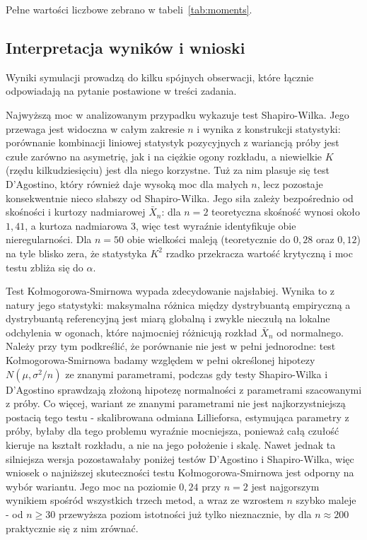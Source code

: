 \documentclass[12pt,a4paper]{article}
\begin{document}
Pełne wartości liczbowe zebrano w tabeli~\ref{tab:moments}.

\begin{table}[H]
    \centering
    \caption{Skośność i kurtoza nadmiarowa średniej $\bar{X}_n$ z rozkładu $\mathrm{Exp}(1)$: empiryczne wartości z $100\,000$ realizacji dla każdego $n$ i krzywe teoretyczne.}
    \label{tab:moments}
    
\end{table}

\subsection{Interpretacja wyników i wnioski}

Wyniki symulacji prowadzą do kilku spójnych obserwacji, które łącznie odpowiadają na pytanie postawione w treści zadania.

Najwyższą moc w analizowanym przypadku wykazuje test Shapiro-Wilka. Jego przewaga jest widoczna w całym zakresie $n$ i wynika z konstrukcji statystyki: porównanie kombinacji liniowej statystyk pozycyjnych z wariancją próby jest czułe zarówno na asymetrię, jak i na ciężkie ogony rozkładu, a niewielkie $K$ (rzędu kilkudziesięciu) jest dla niego korzystne. Tuż za nim plasuje się test D'Agostino, który również daje wysoką moc dla małych $n$, lecz pozostaje konsekwentnie nieco słabszy od Shapiro-Wilka. Jego siła zależy bezpośrednio od skośności i kurtozy nadmiarowej $\bar{X}_n$: dla $n = 2$ teoretyczna skośność wynosi około $1{,}41$, a kurtoza nadmiarowa $3$, więc test wyraźnie identyfikuje obie nieregularności. Dla $n = 50$ obie wielkości maleją (teoretycznie do $0{,}28$ oraz $0{,}12$) na tyle blisko zera, że statystyka $K^2$ rzadko przekracza wartość krytyczną i moc testu zbliża się do $\alpha$.

Test Kołmogorowa-Smirnowa wypada zdecydowanie najsłabiej. Wynika to z natury jego statystyki: maksymalna różnica między dystrybuantą empiryczną a dystrybuantą referencyjną jest miarą globalną i zwykle nieczułą na lokalne odchylenia w ogonach, które najmocniej różnicują rozkład $\bar{X}_n$ od normalnego. Należy przy tym podkreślić, że porównanie nie jest w pełni jednorodne: test Kołmogorowa-Smirnowa badamy względem w pełni określonej hipotezy $N(\mu, \sigma^2/n)$ ze znanymi parametrami, podczas gdy testy Shapiro-Wilka i D'Agostino sprawdzają złożoną hipotezę normalności z parametrami szacowanymi z próby. Co więcej, wariant ze znanymi parametrami nie jest najkorzystniejszą postacią tego testu - skalibrowana odmiana Lillieforsa, estymująca parametry z próby, byłaby dla tego problemu wyraźnie mocniejsza, ponieważ całą czułość kieruje na kształt rozkładu, a nie na jego położenie i skalę. Nawet jednak ta silniejsza wersja pozostawałaby poniżej testów D'Agostino i Shapiro-Wilka, więc wniosek o najniższej skuteczności testu Kołmogorowa-Smirnowa jest odporny na wybór wariantu. Jego moc na poziomie $0{,}24$ przy $n = 2$ jest najgorszym wynikiem spośród wszystkich trzech metod, a wraz ze wzrostem $n$ szybko maleje - od $n \geq 30$ przewyższa poziom istotności już tylko nieznacznie, by dla $n \approx 200$ praktycznie się z nim zrównać.
\end{document}
